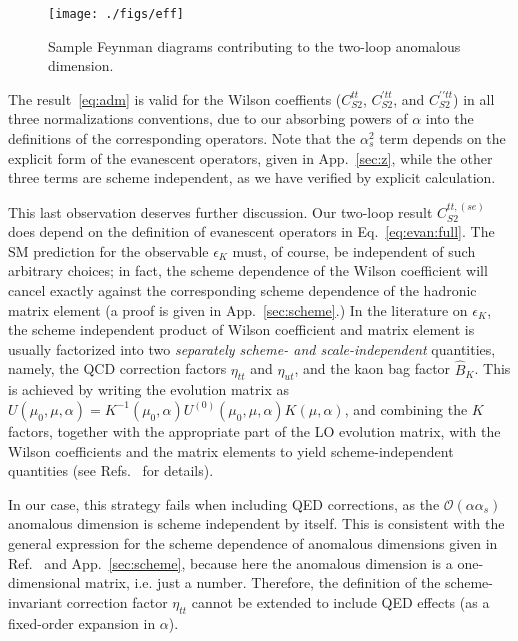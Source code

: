 \documentclass[letter,11pt,DIV=12,abstract=true,numbers=noenddot,titlepage=false,twocolumn=false,draft=false]{scrartcl}
\begin{document}
\begin{figure}[t]
        \centering
        \texttt{[image: ./figs/eff]}
        \caption{Sample Feynman diagrams contributing to the two-loop
          anomalous dimension.
	\label{fig:eff}}
\end{figure}

The result~\eqref{eq:adm} is valid for the Wilson coeffients
($C_{S2}^{tt}$, $C_{S2}^{\prime tt}$, and $C_{S2}^{\prime \prime tt}$)
in all three normalizations conventions, due to our absorbing powers
of $\alpha$ into the definitions of the corresponding operators. Note
that the $\alpha_s^2$ term depends on the explicit form of the
evanescent operators, given in App.~\ref{sec:z}, while the other three
terms are scheme independent, as we have verified by explicit
calculation.

This last observation deserves further discussion. Our two-loop result
$C_{S2}^{tt,(se)}$ does depend on the definition of evanescent
operators in Eq.~\eqref{eq:evan:full}. The SM prediction for the
observable $\epsilon_K$ must, of course, be independent of such
arbitrary choices; in fact, the scheme dependence of the Wilson
coefficient will cancel exactly against the corresponding scheme
dependence of the hadronic matrix element (a proof is given in
App.~\ref{sec:scheme}.) In the literature on $\epsilon_K$, the scheme
independent product of Wilson coefficient and matrix element is
usually factorized into two {\em separately scheme- and
  scale-independent} quantities, namely, the QCD correction factors
$\eta_{tt}$ and $\eta_{ut}$, and the kaon bag factor $\hat B_K$. This
is achieved by writing the evolution matrix as $U(\mu_0,\mu,\alpha) =
K^{-1}(\mu_0,\alpha) U^{(0)}(\mu_0,\mu,\alpha) K(\mu,\alpha)$, and
combining the $K$ factors, together with the appropriate part of the
LO evolution matrix, with the Wilson coefficients and the matrix
elements to yield scheme-independent quantities (see
Refs.~\cite{Buras:1993dy, Buchalla:1995vs} for details).

In our case, this strategy fails when including QED corrections, as
the ${\mathcal O}(\alpha\alpha_s)$ anomalous dimension is scheme
independent by itself. This is consistent with the general expression
for the scheme dependence of anomalous dimensions given in
Ref.~\cite{Buras:1993dy} and App.~\ref{sec:scheme}, because here the
anomalous dimension is a one-dimensional matrix, i.e. just a number.
Therefore, the definition of the scheme-invariant correction factor
$\eta_{tt}$ cannot be extended to include QED effects (as a
fixed-order expansion in $\alpha$).
\end{document}

